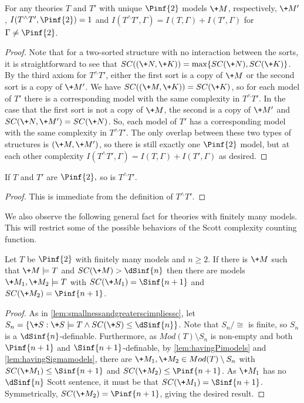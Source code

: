 \documentclass{amsart}
\renewcommand{\-}{\text{-}}
\begin{document}
\begin{lemma}
For any theories $T$ and $T'$ with unique $\Pinf{2}$ models $\+M$, respectively, $\+M'$, $I(T^\wedge T',\Pinf{2})=1$ and $I(T^\wedge T',\Gamma)=I(T,\Gamma)+I(T',\Gamma)$ for $\Gamma\neq \Pinf{2}$.
\end{lemma}

\begin{proof}
  Note that for a two-sorted structure with no interaction between the sorts, it is straightforward to see that $SC((\+N,\+K))=\max\{SC(\+N),SC(\+K)\}$.
By the third axiom for $T^\wedge T'$, either the first sort is a copy of $\+M$ or the second sort is a copy of $\+M'$.
We have $SC((\+M,\+K))=SC(\+K)$, so for each model of $T'$ there is a corresponding model with the same complexity in $T^\wedge T'$.
In the case that the first sort is not a copy of $\+M$, the second is a copy of $\+M'$ and $SC(\+N,\+M')=SC(\+N)$.
So, each model of $T'$ has a corresponding model with the same complexity in $T^\wedge T'$.
The only overlap between these two types of structures is $(\+M,\+M')$, so there is still exactly one $\Pinf{2}$ model, but at each other complexity $I(T^\wedge T',\Gamma)=I(T,\Gamma)+I(T',\Gamma)$ as desired.
\end{proof}

\begin{lemma}
If $T$ and $T'$ are $\Pinf{2},$ so is $T^\wedge T'$.
\end{lemma}

\begin{proof}
This is immediate from the definition of $T^\wedge T'$.
\end{proof}

We also observe the following general fact for theories with finitely many models.
This will restrict some of the possible behaviors of the Scott complexity counting function.

\begin{proposition}\label{prop:aboveDSinfGivesSinfPinf}
Let $T$ be $\Pinf{2}$ with finitely many models and $n\geq2$.
If there is $\+M$ such that $\+M\models T$ and $SC(\+M)>\dSinf{n}$ then there are models $\+M_1,\+M_2\models T$ with $SC(\+M_1)=\Sinf{n+1}$ and $SC(\+M_2)=\Pinf{n+1}$.
\end{proposition}

\begin{proof}
As in \cref{lem:smallnessandgreaterscimpliessc}, let $S_n=\{ \+S: \+S\models T \land SC(\+S)\leq \dSinf{n}\}$.
Note that $S_n/{\cong}$ is finite, so $S_n$ is a $\dSinf{n}$-definable.
Furthermore, as $Mod(T)\setminus S_n$ is  non-empty and both $\Pinf{n+1}$ and $\Sinf{n+1}$-definable, 
by \cref{lem:havingPimodels} and \cref{lem:havingSigmamodels}, there are $\+M_1,\+M_2\in Mod(T)\setminus S_n$ with $SC(\+M_1)\leq\Sinf{n+1}$ and $SC(\+M_2)\leq\Pinf{n+1}$.
As $\+M_1$ has no $\dSinf{n}$ Scott sentence, it must be that $SC(\+M_1)=\Sinf{n+1}$.
Symmetrically, $SC(\+M_2)=\Pinf{n+1}$, giving the desired result.
\end{proof}
\end{document}
